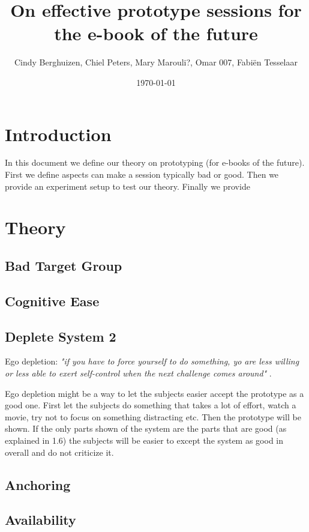 \documentclass{article}
\title{On effective prototype sessions for the e-book of the future}
\author{Cindy Berghuizen, Chiel Peters, Mary Marouli?, Omar 007, Fabi\"en Tesselaar}
\date{\today}
\begin{document}
\maketitle

\tableofcontents

\section{Introduction}

In this document we define our theory on prototyping (for e-books of the future).
First we define aspects can make a session typically bad or good. 
Then we provide an experiment setup to test our theory. Finally we provide 

\section{Theory}

\subsection{Bad Target Group}
\subsection{Cognitive Ease}

\subsection{ Deplete System 2}
Ego depletion:\emph{ "if you have to force yourself to do something, yo are less willing
or less able to exert self-control when the next challenge comes around" }.

Ego depletion might be a way to let the subjects easier accept the prototype
as a good one. First let the subjects do something that takes a lot of effort, watch
a movie, try not to focus on something distracting etc. Then the prototype will
be shown. If the only parts shown of the system are the parts that are good
(as explained in 1.6) the subjects will be easier to except the system as good in
overall and do not criticize it.

\subsection{ Anchoring}
\subsection{ Availability}
\end{document}
